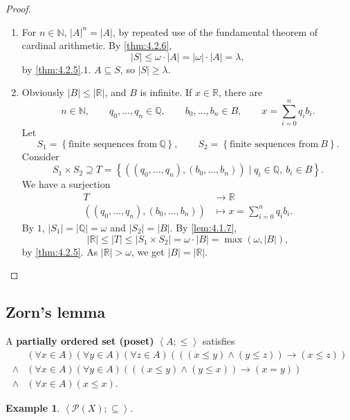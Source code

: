 \documentclass{article}
\newcommand{\N}{\mathbb{N}}
\newcommand{\Q}{\mathbb{Q}}
\newcommand{\R}{\mathbb{R}}
\newcommand{\rb}[1]{\left( #1 \right)}
\newcommand{\cb}[1]{\left\{ #1 \right\}}
\newcommand{\ab}[1]{\left\langle #1 \right\rangle}
\newcommand{\abs}[1]{\left\lvert #1 \right\rvert}
\newcommand{\andb}[2]{\rb{#1 \land #2}}
\newcommand{\impb}[2]{\rb{#1 \rightarrow #2}}
\newcommand{\fab}[1]{\rb{\forall #1}}
\newcommand{\eqb}[2]{\rb{#1 = #2}}
\newcommand{\leb}[2]{\rb{#1 \le #2}}
\theoremstyle{definition}\newtheorem{definition}{Definition}[subsection]
\theoremstyle{definition}\newtheorem{remark1}[definition]{Remark}
\theoremstyle{definition}\newtheorem{example1}[definition]{Example}
\theoremstyle{definition}\newtheorem*{remark2}{Remark}
\theoremstyle{definition}\newtheorem*{example2}{Example}
\theoremstyle{definition}\newtheorem*{note}{Note}
\theoremstyle{definition}\newtheorem*{notation}{Notation}
\begin{document}
\begin{proof}
\hfill
\begin{enumerate}
\item For $ n \in \N $, $ \abs{A}^n = \abs{A} $, by repeated use of the fundamental theorem of cardinal arithmetic. By \ref{thm:4.2.6},
$$ \abs{S} \le \omega \cdot \abs{A} = \abs{\omega} \cdot \abs{A} = \lambda, $$
by \ref{thm:4.2.5}.$ 1 $. $ A \subseteq S $, so $ \abs{S} \ge \lambda $.
\item Obviously $ \abs{B} \le \abs{\R} $, and $ B $ is infinite. If $ x \in \R $, there are
$$ n \in \N, \qquad q_0, \dots, q_n \in \Q, \qquad b_0, \dots, b_n \in B, \qquad x = \sum_{i = 0}^n q_ib_i. $$
Let
$$ S_1 = \cb{\text{finite sequences from} \ \Q}, \qquad S_2 = \cb{\text{finite sequences from} \ B}. $$
Consider
$$ S_1 \times S_2 \supseteq T = \cb{\rb{\rb{q_0, \dots, q_n}, \rb{b_0, \dots, b_n}} \mid q_i \in \Q, \ b_i \in B}. $$
We have a surjection
\begin{align*}
T & \to \R \\
\rb{\rb{q_0, \dots, q_n}, \rb{b_0, \dots, b_n}} & \mapsto x = \sum_{i = 0}^n q_ib_i.
\end{align*}
By $ 1 $, $ \abs{S_1} = \abs{\Q} = \omega $ and $ \abs{S_2} = \abs{B} $. By \ref{lem:4.1.7},
$$ \abs{\R} \le \abs{T} \le \abs{S_1 \times S_2} = \omega \cdot \abs{B} = \max\rb{\omega, \abs{B}}, $$
by \ref{thm:4.2.5}. As $ \abs{\R} > \omega $, we get $ \abs{B} = \abs{\R} $.
\end{enumerate}
\end{proof}

\pagebreak


\subsection{Zorn's lemma}

A \textbf{partially ordered set (poset)} $ \ab{A; \le} $ satisfies
\begin{align*}
& \fab{x \in A}\fab{y \in A}\fab{z \in A}\impb{\andb{\leb{x}{y}}{\leb{y}{z}}}{\leb{x}{z}} \\
\land & \fab{x \in A}\fab{y \in A}\impb{\andb{\leb{x}{y}}{\leb{y}{x}}}{\eqb{x}{y}} \\
\land & \fab{x \in A}\leb{x}{x}.
\end{align*}

\begin{example2}
$ \ab{\mathcal{P}\rb{X}; \subseteq} $.
\end{example2}
\end{document}
